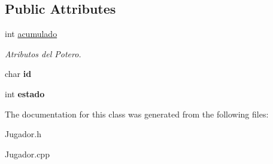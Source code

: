 \subsection*{Public Attributes}
\begin{DoxyCompactItemize}
\item 
\hypertarget{class_jugador_a9df72c40dc67cb49d963bfa756376546}{int \hyperlink{class_jugador_a9df72c40dc67cb49d963bfa756376546}{acumulado}}\label{class_jugador_a9df72c40dc67cb49d963bfa756376546}

\begin{DoxyCompactList}\small\item\em Atributos del Potero. \end{DoxyCompactList}\item 
\hypertarget{class_jugador_a7b805ffc7559ea34bddcb80564832a39}{char {\bfseries id}}\label{class_jugador_a7b805ffc7559ea34bddcb80564832a39}

\item 
\hypertarget{class_jugador_a83b46d72f29a510f670297d55cf9197b}{int {\bfseries estado}}\label{class_jugador_a83b46d72f29a510f670297d55cf9197b}

\end{DoxyCompactItemize}


The documentation for this class was generated from the following files\+:\begin{DoxyCompactItemize}
\item 
Jugador.\+h\item 
Jugador.\+cpp\end{DoxyCompactItemize}
